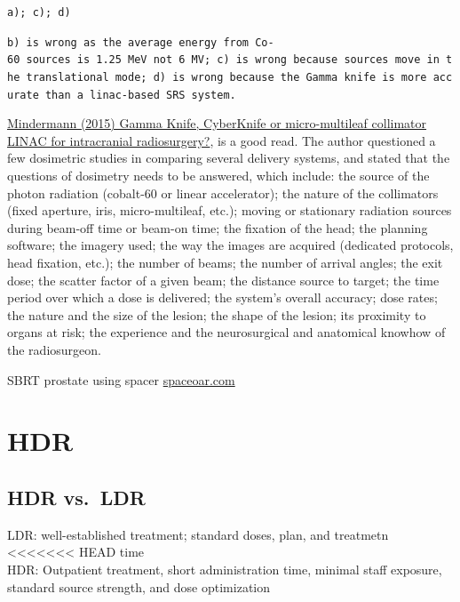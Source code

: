 \documentclass[]{book}
\theoremstyle{definition}
\theoremstyle{definition}
\theoremstyle{definition}
\theoremstyle{remark}
\begin{document}
\texttt{a);\ c);\ d)}

\texttt{b)\ is\ wrong\ as\ the\ average\ energy\ from\ Co-60\ sources\ is\ 1.25\ MeV\ not\ 6\ MV;\ c)\ is\ wrong\ because\ sources\ move\ in\ the\ translational\ mode;\ d)\ is\ wrong\ because\ the\ Gamma\ knife\ is\ more\ accurate\ than\ a\ linac-based\ SRS\ system.}

\href{https://link.springer.com/article/10.1007/s00701-014-2275-6}{Mindermann
(2015) Gamma Knife, CyberKnife or micro-multileaf collimator LINAC for
intracranial radiosurgery?}, is a good read. The author questioned a few
dosimetric studies in comparing several delivery systems, and stated
that the questions of dosimetry needs to be answered, which include: the
source of the photon radiation (cobalt-60 or linear accelerator); the
nature of the collimators (fixed aperture, iris, micro-multileaf, etc.);
moving or stationary radiation sources during beam-off time or beam-on
time; the fixation of the head; the planning software; the imagery used;
the way the images are acquired (dedicated protocols, head fixation,
etc.); the number of beams; the number of arrival angles; the exit dose;
the scatter factor of a given beam; the distance source to target; the
time period over which a dose is delivered; the system's overall
accuracy; dose rates; the nature and the size of the lesion; the shape
of the lesion; its proximity to organs at risk; the experience and the
neurosurgical and anatomical knowhow of the radiosurgeon.

SBRT prostate using spacer
\href{https://www.spaceoar.com/physicians/clinical-publications/}{spaceoar.com}

\chapter{HDR}\label{hdr}

\section{HDR vs.~LDR}\label{hdr-vs.ldr}

LDR: well-established treatment; standard doses, plan, and treatmetn
<<<<<<< HEAD
time\\
HDR: Outpatient treatment, short administration time, minimal staff
exposure, standard source strength, and dose optimization
\end{document}
